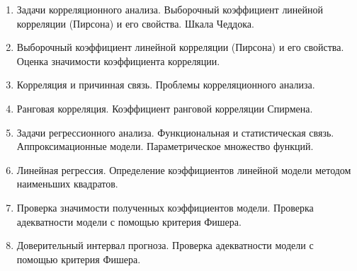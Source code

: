 \documentclass[
]{article}
\providecommand{\tightlist}{%
  \setlength{\itemsep}{0pt}\setlength{\parskip}{0pt}}
\begin{document}
\begin{enumerate}
\def\labelenumi{\arabic{enumi}.}
\tightlist
\item
  Задачи корреляционного анализа. Выборочный коэффициент линейной
  корреляции (Пирсона) и его свойства. Шкала Чеддока.
\item
  Выборочный коэффициент линейной корреляции (Пирсона) и его свойства.
  Оценка значимости коэффициента корреляции.
\item
  Корреляция и причинная связь. Проблемы корреляционного анализа.
\item
  Ранговая корреляция. Коэффициент ранговой корреляции Спирмена.
\item
  Задачи регрессионного анализа. Функциональная и статистическая связь.
  Аппроксимационные модели. Параметрическое множество функций.
\item
  Линейная регрессия. Определение коэффициентов линейной модели методом
  наименьших квадратов.
\item
  Проверка значимости полученных коэффициентов модели. Проверка
  адекватности модели с помощью критерия Фишера.
\item
  Доверительный интервал прогноза. Проверка адекватности модели с
  помощью критерия Фишера.
\end{enumerate}
\end{document}
